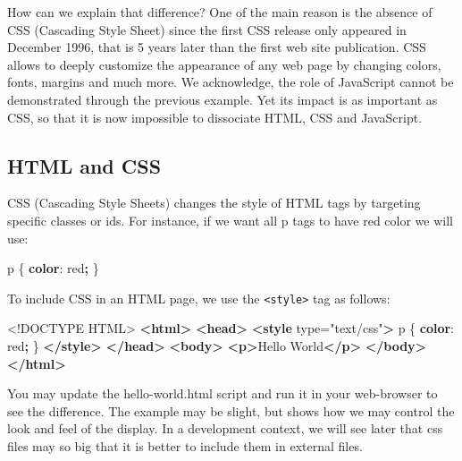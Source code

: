 \documentclass[
]{book}
\newenvironment{Shaded}{\begin{snugshade}}{\end{snugshade}}
\newcommand{\ConstantTok}[1]{\textcolor[rgb]{0.00,0.00,0.00}{#1}}
\newcommand{\DataTypeTok}[1]{\textcolor[rgb]{0.13,0.29,0.53}{#1}}
\newcommand{\KeywordTok}[1]{\textcolor[rgb]{0.13,0.29,0.53}{\textbf{#1}}}
\newcommand{\NormalTok}[1]{#1}
\newcommand{\OperatorTok}[1]{\textcolor[rgb]{0.81,0.36,0.00}{\textbf{#1}}}
\newcommand{\OtherTok}[1]{\textcolor[rgb]{0.56,0.35,0.01}{#1}}
\newcommand{\StringTok}[1]{\textcolor[rgb]{0.31,0.60,0.02}{#1}}
\begin{document}
How can we explain that difference? One of the main reason is the absence of CSS (Cascading Style Sheet) since the first CSS release only appeared in December 1996, that is 5 years later than the first web site publication. CSS allows to deeply customize the appearance of any web page by changing colors, fonts, margins and much more. We acknowledge, the role of JavaScript cannot be demonstrated through the previous example. Yet its impact is as important as CSS, so that it is now impossible to dissociate HTML, CSS and JavaScript.

\hypertarget{html-and-css}{%
\subsection{HTML and CSS}\label{html-and-css}}

CSS (Cascading Style Sheets) changes the style of HTML tags by targeting specific classes or ids. For instance, if we want all p tags to have red color we will use:

\begin{Shaded}
\begin{Highlighting}[]
\NormalTok{p \{}
  \KeywordTok{color}\NormalTok{: }\ConstantTok{red}\OperatorTok{;}
\NormalTok{\}}
\end{Highlighting}
\end{Shaded}

To include CSS in an HTML page, we use the \texttt{\textless{}style\textgreater{}} tag as follows:

\begin{Shaded}
\begin{Highlighting}[]
\DataTypeTok{<!DOCTYPE }\NormalTok{HTML}\DataTypeTok{>}
\KeywordTok{<html>}
  \KeywordTok{<head>}
    \KeywordTok{<style}\OtherTok{ type=}\StringTok{"text/css"}\KeywordTok{>}
\NormalTok{      p \{}
        \KeywordTok{color}\NormalTok{: }\ConstantTok{red}\OperatorTok{;}
\NormalTok{      \}}
    \KeywordTok{</style>}
  \KeywordTok{</head>}
  \KeywordTok{<body>}
  \KeywordTok{<p>}\NormalTok{Hello World}\KeywordTok{</p>}
  \KeywordTok{</body>}
\KeywordTok{</html>}
\end{Highlighting}
\end{Shaded}

You may update the hello-world.html script and run it in your web-browser to see the difference. The example may be slight, but shows how we may control the look and feel of the display. In a development context, we will see later that css files may so big that it is better to include them in external files.
\end{document}
